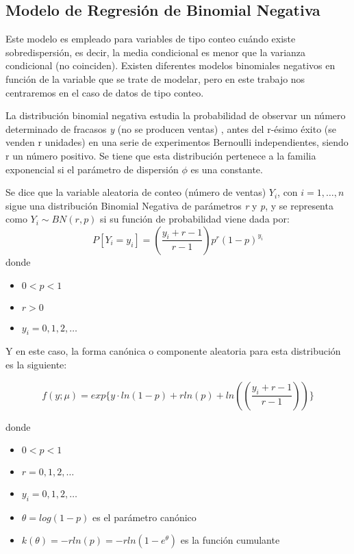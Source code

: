 \documentclass[12pt,a4paper,]{book}
\providecommand{\tightlist}{%
  \setlength{\itemsep}{0pt}\setlength{\parskip}{0pt}}
\numberwithin{dummy}{section}
\theoremstyle{ocrenumbox}
\theoremstyle{blacknumex}
\theoremstyle{blacknumbox}
\theoremstyle{ocrenum}
\theoremstyle{ocrenum}
\begin{document}
\hypertarget{modelo-de-regresiuxf3n-de-binomial-negativa}{%
\subsection{Modelo de Regresión de Binomial
Negativa}\label{modelo-de-regresiuxf3n-de-binomial-negativa}}

Este modelo es empleado para variables de tipo conteo cuándo existe
sobredispersión, es decir, la media condicional es menor que la varianza
condicional (no coinciden). Existen diferentes modelos binomiales
negativos en función de la variable que se trate de modelar, pero en
este trabajo nos centraremos en el caso de datos de tipo conteo.

La distribución binomial negativa estudia la probabilidad de observar un
número determinado de fracasos \emph{y} (no se producen ventas) , antes
del r-ésimo éxito (se venden r unidades) en una serie de experimentos
Bernoulli independientes, siendo r un número positivo. Se tiene que esta
distribución pertenece a la familia exponencial si el parámetro de
dispersión \(\phi\) es una constante.

Se dice que la variable aleatoria de conteo (número de ventas) \(Y_i\),
con \(i=1,\dots,n\) sigue una distribución Binomial Negativa de
parámetros \emph{r} y \emph{p}, y se representa como
\(Y_i \sim BN(r,p)\) si su función de probabilidad viene dada por: \[
P[Y_i=y_i] =  \genfrac{(}{)}{}{}{y_i+r-1}{r-1} p^r(1-p)^{y_i}
\] donde

\begin{itemize}
\tightlist
\item
  \(0<p<1\)
\item
  \(r>0\)
\item
  \(y_i = 0,1,2,\dots\)
\end{itemize}

Y en este caso, la forma canónica o componente aleatoria para esta
distribución es la siguiente:

\[
f(y;\mu) = exp \Bigg\{y \cdot ln(1-p) + r ln(p) + ln(\genfrac{(}{)}{}{}{y_i+r-1}{r-1}) \Bigg\}
\]

donde

\begin{itemize}
\tightlist
\item
  \(0<p<1\)
\item
  \(r=0,1,2,\dots\)
\item
  \(y_i = 0,1,2,\dots\)
\item
  \(\theta= log(1-p)\) es el parámetro canónico
\item
  \(k(\theta)= -rln(p)=-r ln(1-e^\theta)\) es la función cumulante
\end{itemize}
\end{document}
